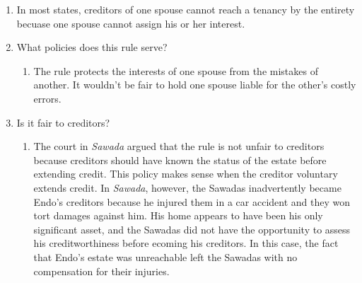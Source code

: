 \begin{enumerate}
    \item In most states, creditors of one spouse cannot reach a tenancy by 
    the entirety becuase one spouse cannot assign his or her interest.
    \item What policies does this rule serve?
    \begin{enumerate}
        \item The rule protects the interests of one spouse from the mistakes 
        of another. It wouldn't be fair to hold one spouse liable for 
        the other's costly errors.
    \end{enumerate}
    \item Is it fair to creditors?
    \begin{enumerate}
        \item The court in \emph{Sawada} argued that the rule is not unfair to 
        creditors because creditors should have known the status of the estate 
        before extending credit. This policy makes sense when the creditor 
        voluntary extends credit. In \emph{Sawada}, however, the Sawadas 
        inadvertently became Endo's creditors because he injured them in a car 
        accident and they won tort damages against him. His home appears to 
        have been his only significant asset, and the Sawadas did not have the 
        opportunity to assess his creditworthiness before ecoming his 
        creditors. In this case, the fact that Endo's estate was unreachable 
        left the Sawadas with no compensation for their injuries.
    \end{enumerate}
\end{enumerate}
